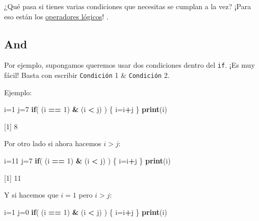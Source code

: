 \documentclass[
]{book}
\newenvironment{Shaded}{\begin{snugshade}}{\end{snugshade}}
\newcommand{\ControlFlowTok}[1]{\textcolor[rgb]{0.13,0.29,0.53}{\textbf{#1}}}
\newcommand{\DecValTok}[1]{\textcolor[rgb]{0.00,0.00,0.81}{#1}}
\newcommand{\KeywordTok}[1]{\textcolor[rgb]{0.13,0.29,0.53}{\textbf{#1}}}
\newcommand{\NormalTok}[1]{#1}
\newcommand{\OperatorTok}[1]{\textcolor[rgb]{0.81,0.36,0.00}{\textbf{#1}}}
\newcommand{\StringTok}[1]{\textcolor[rgb]{0.31,0.60,0.02}{#1}}
\begin{document}
¿Qué pasa si tienes varias condiciones que necesitas se cumplan a la vez? ¡Para eso están los \href{http://cran.r-project.org/doc/manuals/R-lang.html\#Operators}{operadores lógicos}! .

\hypertarget{and}{%
\subsection{And}\label{and}}

Por ejemplo, supongamos queremos usar dos condiciones dentro del \texttt{if}. ¡Es muy fácil! Basta con escribir \texttt{Condición} 1 \& \texttt{Condición} 2.

Ejemplo:

\begin{Shaded}
\begin{Highlighting}[]
\NormalTok{i=}\DecValTok{1}
\NormalTok{j=}\DecValTok{7}
\ControlFlowTok{if}\NormalTok{( (i }\OperatorTok{==}\StringTok{ }\DecValTok{1}\NormalTok{) }\OperatorTok{&}\StringTok{ }\NormalTok{(i }\OperatorTok{<}\StringTok{ }\NormalTok{j) ) \{}
\NormalTok{  i=i}\OperatorTok{+}\NormalTok{j  }
\NormalTok{\}}
\KeywordTok{print}\NormalTok{(i)}
\end{Highlighting}
\end{Shaded}

{[}1{]} 8

Por otro lado si ahora hacemos \(i > j\):

\begin{Shaded}
\begin{Highlighting}[]
\NormalTok{i=}\DecValTok{11}
\NormalTok{j=}\DecValTok{7}
\ControlFlowTok{if}\NormalTok{( (i }\OperatorTok{==}\StringTok{ }\DecValTok{1}\NormalTok{) }\OperatorTok{&}\StringTok{ }\NormalTok{(i }\OperatorTok{<}\StringTok{ }\NormalTok{j) ) \{}
\NormalTok{  i=i}\OperatorTok{+}\NormalTok{j  }
\NormalTok{\}}
\KeywordTok{print}\NormalTok{(i)}
\end{Highlighting}
\end{Shaded}

{[}1{]} 11

Y si hacemos que \(i = 1\) pero \(i > j\):

\begin{Shaded}
\begin{Highlighting}[]
\NormalTok{i=}\DecValTok{1}
\NormalTok{j=}\DecValTok{0}
\ControlFlowTok{if}\NormalTok{( (i }\OperatorTok{==}\StringTok{ }\DecValTok{1}\NormalTok{) }\OperatorTok{&}\StringTok{ }\NormalTok{(i }\OperatorTok{<}\StringTok{ }\NormalTok{j) ) \{}
\NormalTok{  i=i}\OperatorTok{+}\NormalTok{j  }
\NormalTok{\}}
\KeywordTok{print}\NormalTok{(i)}
\end{Highlighting}
\end{Shaded}
\end{document}
